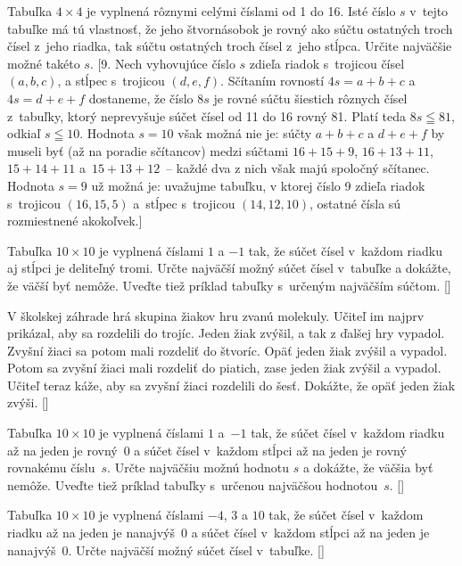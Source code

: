 {Tabuľka $4 \times 4$ je vyplnená rôznymi celými číslami od 1 do 16.
Isté číslo $s$ v~tejto tabuľke má tú vlastnosť, že jeho
štvornásobok je rovný ako súčtu ostatných troch čísel z~jeho riadka,
tak súčtu ostatných troch čísel z~jeho stĺpca.
Určite najväčšie možné takéto $s$.
[9. Nech vyhovujúce číslo $s$ zdieľa riadok s~trojicou čísel $(a,b,c)$,
a stĺpec s~trojicou $(d,e,f)$. Sčítaním rovností $4s=a+b+c$ a
$4s=d+e+f$ dostaneme, že číslo $8s$ je rovné súčtu šiestich rôznych
čísel z~tabuľky, ktorý neprevyšuje súčet čísel
od 11 do 16 rovný 81. Platí teda $8s\leqq81$, odkiaľ $s\leqq10$.
Hodnota $s=10$ však možná nie je: súčty $a+b+c$ a $d+e+f$
by museli byť (až na poradie sčítancov)
medzi súčtami
$16+15+9$, $16+13+11$, $15+14+11$ a~$15+13+12$~-- každé dva
z nich však majú spoločný sčítanec. Hodnota $s=9$ už možná je:
uvažujme tabuľku, v ktorej číslo 9
zdieľa riadok s~trojicou $(16,15,5)$
a~stĺpec s~trojicou $(14,12,10)$, ostatné čísla sú rozmiestnené
akokoľvek.]

\D
Tabuľka $10\times10$ je vyplnená číslami $1$ a ${-1}$ tak, že súčet
čísel v~každom riadku aj stĺpci je deliteľný tromi. Určte
najväčší možný súčet čísel v~tabuľke a dokážte, že väčší byť
nemôže. Uveďte tiež príklad tabuľky s~určeným najväčším
súčtom. []

V školskej záhrade hrá skupina žiakov hru zvanú molekuly. Učiteľ im najprv prikázal, aby sa rozdelili do trojíc.
Jeden žiak zvýšil, a tak z ďalšej hry vypadol. Zvyšní žiaci sa potom mali rozdeliť do štvoríc. Opäť jeden žiak zvýšil
a vypadol. Potom sa zvyšní žiaci mali rozdeliť do piatich, zase jeden žiak zvýšil a vypadol. Učiteľ teraz káže, aby
sa zvyšní žiaci rozdelili do šesť. Dokážte, že opäť jeden žiak zvýši.
[]

Tabuľka $10\times 10$ je vyplnená číslami $1$ a~${-1}$ tak, že súčet čísel
v~každom riadku až na jeden je rovný~0 a súčet čísel v~každom stĺpci až
na jeden je rovný rovnakému číslu~$s$. Určte najväčšiu možnú
hodnotu $s$ a dokážte, že väčšia byť nemôže. Uveďte tiež príklad tabuľky
s~určenou najväčšou hodnotou~$s$. []

Tabuľka $10\times 10$ je vyplnená číslami ${-4}$, $3$ a $10$ tak, že súčet čísel
v~každom riadku až na jeden je nanajvýš~0 a súčet čísel v~každom stĺpci až
na jeden je nanajvýš~0. Určte najväčší možný súčet čísel v~tabuľke.
[]

}
